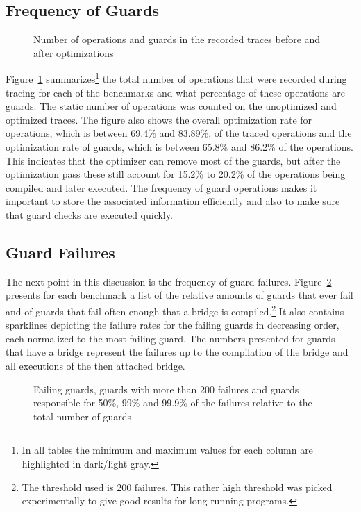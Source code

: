 \documentclass[letter,10pt]{sigplanconf}
\begin{document}
\subsection{Frequency of Guards}
\label{sub:guard_frequency}
\begin{figure}
    
    \caption{Number of operations and guards in the recorded traces before and after optimizations}
    \label{fig:benchmarks}
\end{figure}

Figure~\ref{fig:benchmarks} summarizes\footnote{In all tables the minimum and
maximum values for each column are highlighted in dark/light gray.} the total number of operations that were
recorded during tracing for each of the benchmarks and what percentage of these
operations are guards. The static number of operations was counted on the unoptimized
and optimized traces. The figure also shows the overall optimization rate for
operations, which is between 69.4\% and 83.89\%, of the traced operations and the
optimization rate of guards, which is between 65.8\% and 86.2\% of the
operations. This indicates that the optimizer can remove
most of the guards, but after the optimization pass these still account for
15.2\% to 20.2\% of the operations being compiled and later executed.
The frequency of guard operations makes it important to store the associated
information efficiently and also to make sure that guard checks are executed
quickly.

\subsection{Guard Failures}
\label{sub:guard_failure}
The next point in this discussion is the frequency of guard failures.
Figure~\ref{fig:failing_guards} presents for each benchmark a list of the
relative amounts of guards that ever fail and of guards that fail often enough that a bridge is compiled.\footnote{
    The threshold used is 200 failures. This rather high threshold was picked experimentally to give
    good results for long-running programs.
}
It also contains sparklines depicting the failure rates for the failing guards
in decreasing order, each normalized to the most failing guard.
The numbers presented for guards that have a bridge represent the
failures up to the compilation of the bridge and all executions of the then
attached bridge.

\begin{figure}
    
    \caption{Failing guards, guards with more than 200 failures and guards
    responsible for 50\%, 99\% and 99.9\% of the failures relative to the total number of guards}
    \label{fig:failing_guards}
\end{figure}
\end{document}
